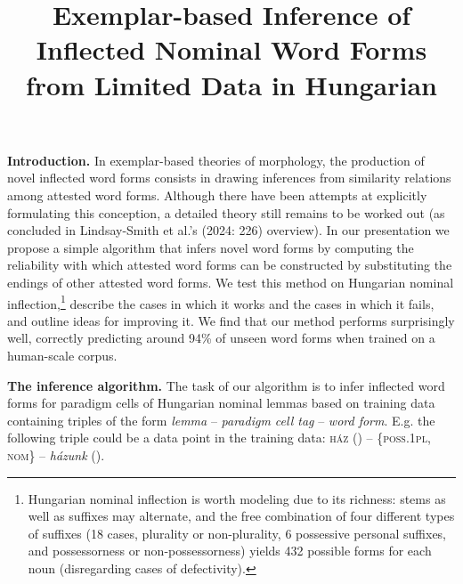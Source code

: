 \documentclass[12pt, a4paper]{article}
\title{\fontsize{13}{16}\selectfont Exemplar-based Inference of Inflected Nominal Word Forms \\ from Limited Data in Hungarian}
\author{}
\date{\vspace{-3em}}
\begin{document}
\maketitle

\textbf{Introduction.} In exemplar-based theories of morphology, the production of novel inflected word forms consists in drawing inferences from similarity relations among attested word forms. Although there have been attempts at explicitly formulating this conception, a detailed theory still remains to be worked out (as concluded in Lindsay-Smith et al.'s (2024: 226) overview). In our presentation we propose a simple algorithm that infers novel word forms by computing the reliability with which attested word forms can be constructed by substituting the endings of other attested word forms. We test this method on Hungarian nominal inflection,\footnote{Hungarian nominal inflection is worth modeling due to its richness: stems as well as suffixes may alternate, and the free combination of four different types of suffixes (18 cases, plurality or non-plurality, 6 possessive personal suffixes, and possessorness or non-possessorness) yields 432 possible forms for each noun (disregarding cases of defectivity).}
describe the cases in which it works and the cases in which it fails, and outline ideas for improving it. We find that our method performs surprisingly well, correctly predicting around 94\% of unseen word forms when trained on a human-scale corpus.

\textbf{The inference algorithm.} The task of our algorithm is to infer inflected word forms for paradigm cells of Hungarian nominal lemmas based on training data containing triples of the form \textit{lemma} -- \textit{paradigm cell tag} -- \textit{word form}. E.g. the following triple could be a data point in the training data: \textsc{ház} () -- \textsc{\{poss.1pl, nom\}} -- \textit{házunk} ().
\end{document}
